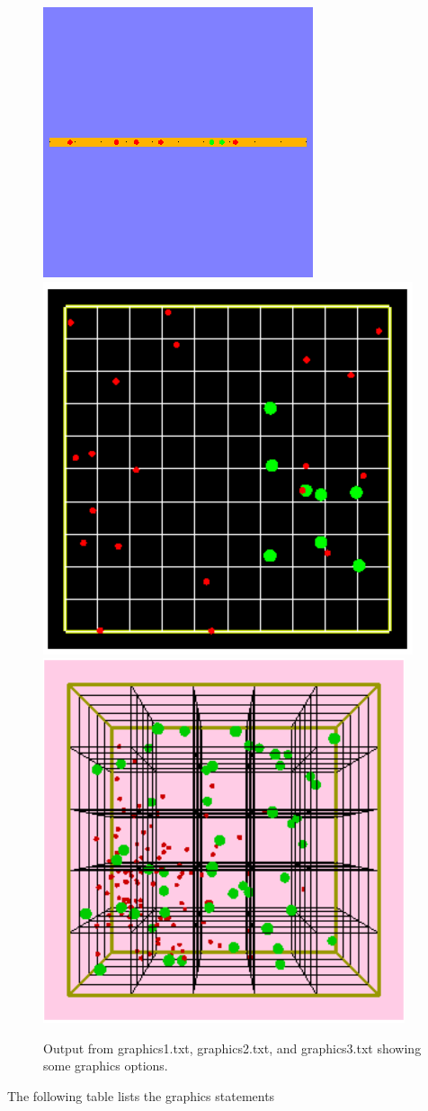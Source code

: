 \documentclass {book}
\begin{document}
\begin{figure}[h]
\centering
\includegraphics[height=5 cm]{figures/image16}
\includegraphics[height=5 cm]{figures/image17}
\includegraphics[height=5 cm]{figures/image18}
\caption{Output from graphics1.txt, graphics2.txt, and graphics3.txt showing some graphics options.}
\label{fig:graphics1}
\end{figure}

The following table lists the graphics statements
\end{document}
